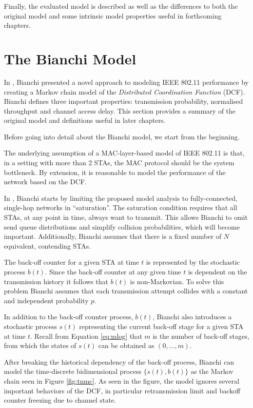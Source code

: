 Finally, the evaluated model \cite{felemban} is described as well as the
differences to both the original model \cite{bianchi} and some intrinsic model
properties useful in forthcoming chapters.

\section{The Bianchi Model}

In \cite{bianchi}, Bianchi presented a novel approach to modeling IEEE 802.11
performance by creating a Markov chain model of the \emph{Distributed
Coordination Function} (DCF). Bianchi defines three important properties:
transmission probability, normalised throughput and channel access delay. This
section provides a summary of the original model and definitions useful in
later chapters.

Before going into detail about the Bianchi model, we start from the beginning.

The underlying assumption of a MAC-layer-based model of IEEE 802.11 is that,
in a setting with more than 2 STAs, the MAC protocol should be the system
bottleneck. By extension, it is reasonable to model the performance of the
network based on the DCF. 

In \cite{bianchi}, Bianchi starts by limiting the proposed model analysis to
fully-connected, single-hop networks in ``saturation''. The saturation
condition requires that all STAs, at any point in time, always want to
transmit. This allows Bianchi to omit send queue distributions and simplify
collision probabilities, which will become important. Additionally, Bianchi
assumes that there is a fixed number of $N$ equivalent, contending STAs.

The back-off counter for a given STA at time $t$ is represented by the
stochastic process $b(t)$. Since the back-off counter at any given time $t$ is
dependent on the transmission history it follows that $b(t)$ is non-Markovian.
To solve this problem Bianchi assumes that each transmission attempt collides
with a constant and independent probability $p$.

In addition to the back-off counter process, $b(t)$, Bianchi also introduces a
stochastic process $s(t)$ representing the current back-off stage for a given
STA at time $t$. Recall from Equation \ref{eq:mlog} that $m$ is the number of
back-off stages, from which the states of $s(t)$ can be obtained as $(0,
\dots, m)$.

After breaking the historical dependency of the back-off process, Bianchi can
model the time-discrete bidimensional process $\{s(t), b(t)\}$ as the Markov
chain seen in Figure \ref{fig:tnmc}. As seen in the figure, the model ignores
several important behaviors of the DCF, in particular retransmission limit and
backoff counter freezing due to channel state.

